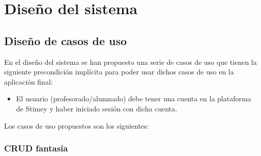 \chapter{Diseño del sistema}
%
%
\section{Diseño de casos de uso}
En el diseño del sistema se han propuesto una serie de casos de uso que tienen la siguiente precondición implícita para poder usar dichos casos de uso en la aplicación final:
\begin{itemize}
	\item El usuario (profesorado/alumnado) debe tener una cuenta en la plataforma de Stimey y haber iniciado sesión con dicha cuenta.
\end{itemize}

Los casos de uso propuestos son los siguientes:

\subsection{CRUD fantasía}
\hypertarget{crearfantasia}{}
